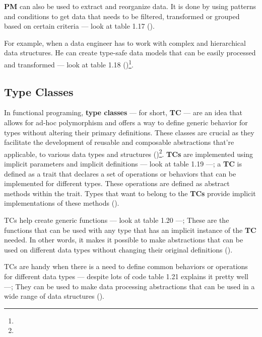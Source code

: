

\textbf{PM} can also be used to extract and reorganize data. It is done by using patterns and conditions to get data that needs to be filtered, transformed or grouped based on certain criteria  — look at table 1.17 (\cite{michael.etal_2023})\footnotemark[11].



For example, when a data engineer has to work with complex and hierarchical data structures. He can create type-safe data models that can be easily processed and transformed — look at table 1.18 (\cite{michael.etal_2023})\footnote[11]{}.



\subsection{Type Classes}

In functional programing, \textbf{type classes} — for short, \textbf{TC} — are an idea that allows for ad-hoc polymorphism and offers a way to define generic behavior for types without altering their primary definitions. These classes are crucial as they facilitate the development of reusable and composable abstractions that're applicable, to various data types and structures (\cite{odersky.etal_2021})\footnote[2]{}. \textbf{TCs} are implemented using implicit parameters and implicit definitions — look at table 1.19 —; a \textbf{TC} is defined as a trait that declares a set of operations or behaviors that can be implemented for different types. These operations are defined as abstract methods within the trait. Types that want to belong to the \textbf{TCs} provide implicit implementations of these methods (\cite{odersky.etal_2021})\footnotemark[2].



TCs help create generic functions — look at table 1.20 —; These are the functions that can be used with any type that has an implicit instance of the \textbf{TC} needed. In other words, it makes it possible to make abstractions that can be used on different data types without changing their original definitions (\cite{odersky.etal_2021})\footnotemark[2].



TCs are handy when there is a need to define common behaviors or operations for different data types — despite lots of code table 1.21 explains it pretty well —; They can be used to make data processing abstractions that can be used in a wide range of data structures (\cite{odersky.etal_2021})\footnotemark[2].


